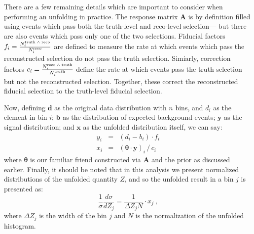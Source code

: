 	There are a few remaining details which are important to consider when performing an unfolding in practice. The response matrix $\mathbf{A}$ is by definition filled using events which pass both the truth-level and reco-level selection--- but there are also events which pass only one of the two selections. Fiducial factors $f_{i} = \frac{N^{\rm truth\;\wedge\;reco}_{i}}{N^{\rm reco}_{i}}$ are defined to measure the rate at which events which pass the reconstructed selection do not pass the truth selection. Simiarly, correction factors $c_{i} = \frac{N^{\rm reco\;\wedge\;truth}_{i}}{N^{\rm truth}_{i}}$ define the rate at which events pass the truth selection but not the reconstructed selection. Together, these correct the reconstructed fiducial selection to the truth-level fiducial selection.

	Now, defining $\mathbf{d}$ as the original data distribution with $n$ bins, and $d_i$ as the element in bin $i$; $\mathbf{b}$ as the distribution of expected background events; $\mathbf{y}$ as the signal distribution; and $\mathbf{x}$ as the unfolded distribution itself, we can say:
%
\begin{equation}
\begin{array} {rcl}
  y_i & = & (d_i - b_i) \cdot f_i \\
    x_i & = & (\boldsymbol{\theta} \cdot \mathbf{y})_i\,/\,c_i
    \end{array}
\end{equation}
%
	where $\mathbf{\theta}$ is our familiar friend constructed via $\mathbf{A}$ and the prior as discussed earlier. Finally, it should be noted that in this analysis we present normalized distributions of the unfolded quantity $Z$, and so the unfolded result in a bin $j$ is presented as:
%
\begin{equation}
  \frac{1}{\sigma} \frac{d\sigma}{dZ_j} = \frac{1}{\Delta Z_j N} \cdot x_j \ ,
\end{equation}
%
where $\Delta Z_j$ is the width of the bin $j$ and $N$ is the normalization of the unfolded histogram.

